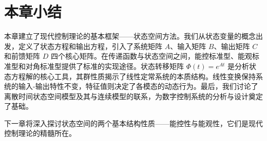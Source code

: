 \section{本章小结}

本章建立了现代控制理论的基本框架——状态空间方法。我们从状态变量的概念出发，定义了状态方程和输出方程，引入了系统矩阵 $A$、输入矩阵 $B$、输出矩阵 $C$ 和前馈矩阵 $D$ 四个核心矩阵。在传递函数与状态空间之间，能控标准型、能观标准型和对角标准型提供了标准的实现途径。状态转移矩阵 $\Phi(t) = e^{At}$ 是分析状态方程解的核心工具，其群性质揭示了线性定常系统的本质结构。线性变换保持系统的输入-输出特性不变，特征值则决定了各模态的动态行为。最后，我们讨论了离散时间状态空间模型及其与连续模型的联系，为数字控制系统的分析与设计奠定了基础。

下一章将深入探讨状态空间的两个基本结构性质——能控性与能观性，它们是现代控制理论的精髓所在。
